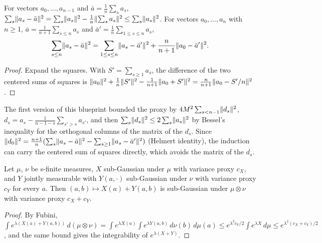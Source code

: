 \begin{lemma}
  \label{lem:column_bessel}
  \leanok
  For vectors $a_0, \dots, a_{n-1}$ and $\bar a = \frac1n \sum_s a_s$,
  $\sum_s \lVert a_s - \bar a \rVert^2 = \sum_s \lVert a_s \rVert^2 - \frac1n \lVert \sum_s a_s \rVert^2
  \le \sum_s \lVert a_s \rVert^2$. For vectors $a_0, \dots, a_n$ with $n \ge 1$,
  $\bar a = \frac{1}{n+1} \sum_{s \le n} a_s$ and $\bar a' = \frac1n \sum_{1 \le s \le n} a_s$,
  \[
    \sum_{s \le n} \lVert a_s - \bar a \rVert^2 = \sum_{1 \le s \le n} \lVert a_s - \bar a' \rVert^2
      + \frac{n}{n + 1} \lVert a_0 - \bar a' \rVert^2.
  \]
\end{lemma}

\begin{proof}
  \leanok
  Expand the squares. With $S' = \sum_{s \ge 1} a_s$, the difference of the two centered sums of
  squares is $\lVert a_0 \rVert^2 + \frac1n \lVert S' \rVert^2 - \frac{1}{n + 1} \lVert a_0 + S' \rVert^2
  = \frac{n}{n + 1} \lVert a_0 - S'/n \rVert^2$.
\end{proof}

\begin{remark}
  The first version of this blueprint bounded the proxy by $4M^2 \sum_{s < n - 1} \lVert d_s \rVert^2$,
  $d_s = a_s - \frac{1}{n - 1 - s} \sum_{s' > s} a_{s'}$, and then
  $\sum_s \lVert d_s \rVert^2 \le 2 \sum_s \lVert a_s \rVert^2$ by Bessel's inequality for the orthogonal columns
  of the matrix of the $d_s$. Since $\lVert d_0 \rVert^2 = \frac{n + 1}{n} (\sum_s \lVert a_s - \bar a \rVert^2 -
  \sum_{s \ge 1} \lVert a_s - \bar a' \rVert^2)$ (Helmert identity), the induction can carry the centered
  sum of squares directly, which avoids the matrix of the $d_s$.
\end{remark}

\begin{lemma}
  \label{lem:subgaussian_add_prod}
  \leanok
  Let $\mu$, $\nu$ be s-finite measures, $X$ sub-Gaussian under $\mu$ with variance proxy $c_X$,
  and $Y$ jointly measurable with $Y(a, \cdot)$ sub-Gaussian under $\nu$ with variance proxy $c_Y$
  for every $a$. Then $(a, b) \mapsto X(a) + Y(a, b)$ is sub-Gaussian under $\mu \otimes \nu$ with
  variance proxy $c_X + c_Y$.
\end{lemma}

\begin{proof}
  \leanok
  By Fubini, $\int e^{\lambda (X(a) + Y(a, b))} \,d(\mu \otimes \nu)
  = \int e^{\lambda X(a)} \int e^{\lambda Y(a, b)} \,d\nu(b) \,d\mu(a)
  \le e^{\lambda^2 c_Y / 2} \int e^{\lambda X} \,d\mu \le e^{\lambda^2 (c_X + c_Y) / 2}$, and the
  same bound gives the integrability of $e^{\lambda (X + Y)}$.
\end{proof}

